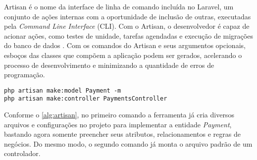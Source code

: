 Artisan é o nome da interface de linha de comando incluída no Laravel, um conjunto de ações internas com a oportunidade de inclusão de outras, executadas pela \textit{Command Line Interface} (CLI). Com o Artisan, o desenvolvedor é capaz de acionar ações, como testes de unidade, tarefas agendadas e execução de migrações do banco de dados \cite{mccool2012laravel}. Com os comandos do Artisan e seus argumentos opcionais, esboços das classes que compõem a aplicação podem ser gerados, acelerando o processo de desenvolvimento e minimizando a quantidade de erros de programação.

\begin{lstlisting}[caption={Comandos Artisan}, style=htmlcssjs, label=alg:artisan]
php artisan make:model Payment -m
php artisan make:controller PaymentsController
\end{lstlisting}

Conforme o \autoref{alg:artisan}, no primeiro comando a ferramenta já cria diversos arquivos e configurações no projeto para implementar a entidade \textit{Payment}, bastando agora somente preencher seus atributos, relacionamentos e regras de negócios. Do mesmo modo, o segundo comando já monta o arquivo padrão de um controlador.
